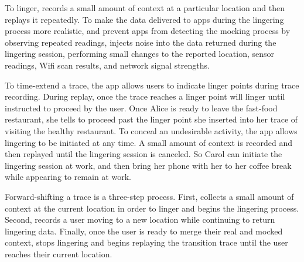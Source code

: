 To linger, \PocketMocker{} records a small amount of context at a particular
location and then replays it repeatedly. To make the data delivered to apps
during the lingering process more realistic, and prevent apps from detecting
the mocking process by observing repeated readings, \PocketMocker{} injects
noise into the data returned during the lingering session, performing small
changes to the reported location, sensor readings, Wifi scan results, and
network signal strengths.

To time-extend a trace, the app allows users to indicate linger points during
trace recording. During replay, once the trace reaches a linger point
\PocketMocker{} will linger until instructed to proceed by the user. Once
Alice is ready to leave the fast-food restaurant, she tells \PocketMocker{}
to proceed past the linger point she inserted into her trace of visiting the
healthy restaurant. To conceal an undesirable activity, the \PocketMocker{}
app allows lingering to be initiated at any time. A small amount of context
is recorded and then replayed until the lingering session is canceled. So
Carol can initiate the lingering session at work, and then bring her phone
with her to her coffee break while appearing to remain at work.

Forward-shifting a trace is a three-step process. First, \PocketMocker{}
collects a small amount of context at the current location in order to linger
and begins the lingering process. Second, \PocketMocker{} records a user
moving to a new location while continuing to return lingering data. Finally,
once the user is ready to merge their real and mocked context,
\PocketMocker{} stops lingering and begins replaying the transition trace
until the user reaches their current location.
